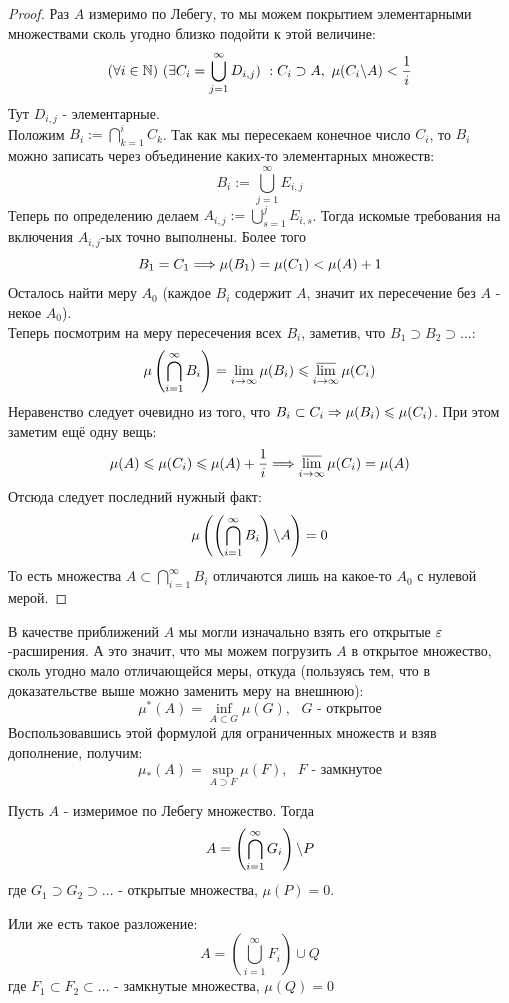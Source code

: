 \begin{proof}
	Раз $A$ измеримо по Лебегу, то мы можем покрытием элементарными множествами сколь угодно близко подойти к этой величине:
	\[
		(\forall i \in \mathbb{N})\ (\exists C_i = \bigcup_{j = 1}^\infty D_{i, j}) \ : C_i \supset A,\ \mu(C_i \backslash A) < \frac{1}{i}
	\]
	Тут $D_{i, j}$ - элементарные. \\
	Положим $B_i := \bigcap\limits_{k = 1}^i C_k$. Так как мы пересекаем конечное число $C_i$, то $B_i$ можно записать через объединение каких-то элементарных множеств:
	\[
		B_i := \bigcup_{j = 1}^\infty E_{i, j}
	\]
	Теперь по определению делаем $A_{i, j} := \bigcup_{s = 1}^j E_{i, s}$. Тогда искомые требования на включения $A_{i, j}$-ых точно выполнены. Более того
	\[
		B_1 = C_1 \Longrightarrow \mu(B_1) = \mu(C_1) < \mu(A) + 1
	\]
	Осталось найти меру $A_0$ (каждое $B_i$ содержит $A$, значит их пересечение без $A$ - некое $A_0$).\\
	Теперь посмотрим на меру пересечения всех $B_i$, заметив, что $B_1 \supset B_2 \supset... $:
	\[
		\mu\left(\bigcap_{i = 1}^\infty B_i\right) = \lim\limits_{i \to \infty} \mu(B_i) \leqslant \varlimsup_{i \to \infty} \mu(C_i)
	\]
	Неравенство следует очевидно из того, что $B_i \subset C_i \Rightarrow \mu(B_i) \leqslant \mu(C_i)$. При этом заметим ещё одну вещь:
	\[
		\mu(A) \leqslant \mu(C_i) \leqslant \mu(A) + \frac{1}{i} \Longrightarrow \varlimsup_{i \to \infty} \mu(C_i) = \mu(A)
	\]
	Отсюда следует последний нужный факт:
	\[
		\mu\left(\left(\bigcap_{i = 1}^\infty B_i\right) \backslash A \right) = 0
	\]
	То есть множества $A \subset \bigcap_{i = 1}^\infty B_i$ отличаются лишь на какое-то $A_0$ с нулевой мерой.
\end{proof}

\begin{note}
	В качестве приближений $A$ мы могли изначально взять его открытые $\varepsilon$-расширения. А это значит, что мы можем погрузить $A$ в открытое множество, сколь угодно мало отличающейся меры, откуда (пользуясь тем, что в доказательстве выше можно заменить меру на внешнюю):
	\[
		\mu^*(A) = \inf\limits_{A \subset G} \mu(G),\text{ $G$ - открытое}	
	\]
	Воспользовавшись этой формулой для ограниченных множеств и взяв дополнение, получим:
	\[
	\mu_*(A) = \sup\limits_{A \supset F} \mu(F),\text{ $F$ - замкнутое}	
	\]
\end{note}

\begin{corollary}
	Пусть $A$ - измеримое по Лебегу множество. Тогда
	\[
		A = \left(\bigcap_{i = 1}^\infty G_i\right) \backslash P
	\]
	где $G_1 \supset G_2 \supset \ldots$ - открытые множества, $\mu(P) = 0$.
	
	Или же есть такое разложение:
	\[
		A = \left(\bigcup_{i = 1}^\infty F_i\right) \cup Q
	\]
	где $F_1 \subset F_2 \subset \ldots$ - замкнутые множества, $\mu(Q) = 0$
\end{corollary}

